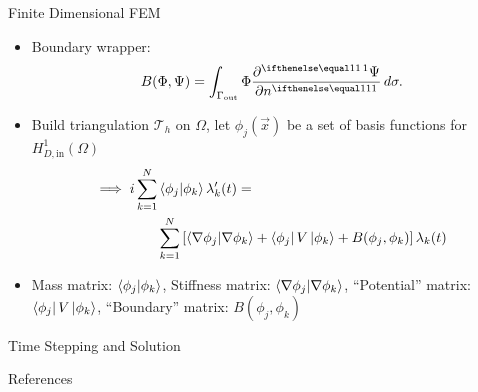 \documentclass{beamer}
\begin{document}
\begin{frame}{Finite Dimensional FEM}
\begin{itemize} 
		\item Boundary wrapper:
				\[
						B(\Phi, \Psi) = \int_{\Gamma_\mathrm{out}}
						\Phi \pder{\Psi}{n} \, d\sigma
				.\] 
		\item Build triangulation $\mathcal T_h$ on $\Omega$, let 
				$\phi_j(\vec x)$ be a set of basis functions for 
				$H^1_{D, \mathrm{in}}(\Omega)$
			\[\begin{split}
					\implies i \sum_{k=1}^N 
					& \bra{\phi_j} \ket{\phi_k} \lambda_k'(t) = \\
					& \sum_{k=1}^N \left[
					\bra{\nabla \phi_j} \ket{\nabla \phi_k}
	       			+ \bra{\phi_j} V \ket{\phi_k} + 
					B(\phi_j, \phi_k)
			\right] 
					\lambda_k(t)
			\end{split}\] 
	\item Mass matrix: 
			$\bra{\phi_j}\ket{\phi_k}$, 
			Stiffness matrix:
			$\bra{\nabla \phi_j}\ket{\nabla \phi_k}$,
			``Potential'' matrix:
			$\bra{\phi_j} V \ket{\phi_k}$, 
			``Boundary'' matrix:
			$B(\phi_j, \phi_k)$
\end{itemize}
\end{frame}

\begin{frame}{Time Stepping and Solution}
  
\end{frame}
\begin{frame}{References}
		
		
		\nocite{*}
\end{frame}
\end{document}
